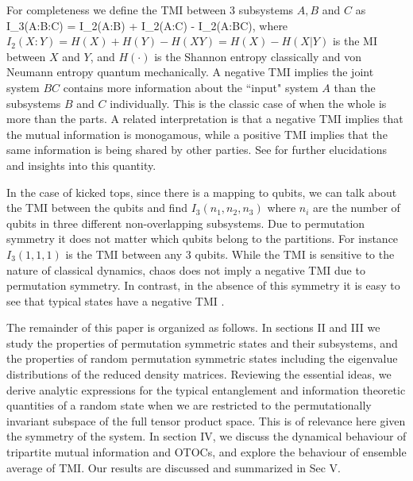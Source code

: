 \documentclass[pre,aps,showpacs,showkeys,twocolumn]{revtex4-1}
\theoremstyle{definition}
\theoremstyle{remark}
\begin{document}
For completeness we define the TMI between 3 subsystems $A,B$ and $C$ as
\beq 
\label{eqn:tmi_from_mi}
I_3(A:B:C) = I_2(A:B) + I_2(A:C) - I_2(A:BC), 
\eeq
where $I_2(X:Y) = H(X) + H(Y) - H(XY) = H(X) - H(X|Y)$ is the MI between $X$ and $Y$, and $H(\cdot)$ is the Shannon entropy classically and von Neumann entropy quantum mechanically. A negative TMI implies the joint system $BC$ contains more information about the ``input" system $A$ than the  subsystems $B$ and $C$ individually. This is the classic case of when the whole is more than the parts. A related interpretation is that a negative TMI implies that the mutual information is monogamous, while a positive TMI implies that the same information is being shared by other parties. See \cite{IyodaSagawa, rangamani2015entanglement, rota2016tripartite} for further elucidations and insights into this quantity.

In the case of kicked tops, since there is a mapping to qubits, we can talk about the TMI between the qubits and find $I_3(n_1, n_2, n_3)$ where $n_i$ are the number of qubits in three different non-overlapping subsystems. Due to permutation symmetry it does not matter which qubits belong to the partitions. For instance $I_3(1, 1, 1)$ is the TMI between any 3 qubits. While the TMI is sensitive to the nature of classical dynamics, chaos does not imply a negative TMI due to permutation symmetry. In contrast, in the absence of this symmetry it is easy to see that typical states have a negative TMI \cite{rangamani2015entanglement}.

The remainder of this paper is organized as follows. In sections II and III  we study the properties of permutation symmetric states and their subsystems, and the properties of random permutation symmetric states including the eigenvalue distributions of the reduced density matrices. Reviewing the essential ideas, we derive analytic expressions for the typical entanglement and information theoretic quantities of a random state when we are restricted to the permutationally invariant subspace of the full tensor product space. This is of relevance here given the symmetry of the system. In section IV, we discuss the dynamical behaviour of tripartite mutual information and OTOCs, and explore the behaviour of ensemble average of TMI. Our results are discussed and summarized in Sec V.
\end{document}
